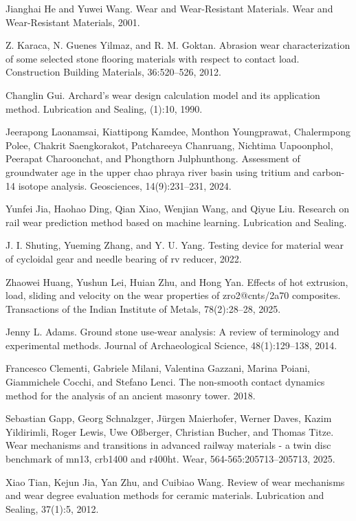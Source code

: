 \documentclass[11pt,a4paper]{ctexart}
\begin{document}
\begin{enumerate}[label={[\arabic*]},leftmargin=2.6em,itemsep=2pt,topsep=2pt]
\item Jianghai He and Yuwei Wang. Wear and Wear-Resistant Materials. Wear and Wear-Resistant Materials, 2001.
\item Z. Karaca, N. Guenes Yilmaz, and R. M. Goktan. Abrasion wear characterization of some selected stone flooring materials with respect to contact load. Construction Building Materials, 36:520--526, 2012.
\item Changlin Gui. Archard's wear design calculation model and its application method. Lubrication and Sealing, (1):10, 1990.
\item Jeerapong Laonamsai, Kiattipong Kamdee, Monthon Youngprawat, Chalermpong Polee, Chakrit Saengkorakot, Patchareeya Chanruang, Nichtima Uapoonphol, Peerapat Charoonchat, and Phongthorn Julphunthong. Assessment of groundwater age in the upper chao phraya river basin using tritium and carbon-14 isotope analysis. Geosciences, 14(9):231--231, 2024.
\item Yunfei Jia, Haohao Ding, Qian Xiao, Wenjian Wang, and Qiyue Liu. Research on rail wear prediction method based on machine learning. Lubrication and Sealing.
\item J. I. Shuting, Yueming Zhang, and Y. U. Yang. Testing device for material wear of cycloidal gear and needle bearing of rv reducer, 2022.
\item Zhaowei Huang, Yushun Lei, Huian Zhu, and Hong Yan. Effects of hot extrusion, load, sliding and velocity on the wear properties of zro2@cnts/2a70 composites. Transactions of the Indian Institute of Metals, 78(2):28--28, 2025.
\item Jenny L. Adams. Ground stone use-wear analysis: A review of terminology and experimental methods. Journal of Archaeological Science, 48(1):129--138, 2014.
\item Francesco Clementi, Gabriele Milani, Valentina Gazzani, Marina Poiani, Giammichele Cocchi, and Stefano Lenci. The non-smooth contact dynamics method for the analysis of an ancient masonry tower. 2018.
\item Sebastian Gapp, Georg Schnalzger, J\"urgen Maierhofer, Werner Daves, Kazim Yildirimli, Roger Lewis, Uwe O\ss berger, Christian Bucher, and Thomas Titze. Wear mechanisms and transitions in advanced railway materials - a twin disc benchmark of mn13, crb1400 and r400ht. Wear, 564-565:205713--205713, 2025.
\item Xiao Tian, Kejun Jia, Yan Zhu, and Cuibiao Wang. Review of wear mechanisms and wear degree evaluation methods for ceramic materials. Lubrication and Sealing, 37(1):5, 2012.

\end{enumerate}
\end{document}
